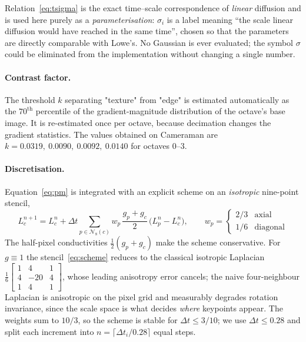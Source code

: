\documentclass[11pt,a4paper]{article}
\newcommand{\Kvals}{0.0319,\ 0.0090,\ 0.0092,\ 0.0140}  %
\begin{document}
Relation~\eqref{eq:tsigma} is the exact time--scale correspondence of
\emph{linear} diffusion and is used here purely as a \emph{parameterisation}:
$\sigma_i$ is a label meaning ``the scale linear diffusion would have reached in
the same time'', chosen so that the parameters are directly comparable with
Lowe's. No Gaussian is ever evaluated; the symbol $\sigma$ could be eliminated
from the implementation without changing a single number.

\paragraph{Contrast factor.} The threshold $k$ separating "texture" from
"edge" is estimated automatically as the $70^{\text{th}}$ percentile of the
gradient-magnitude distribution of the octave's base image. It is re-estimated
once per octave, because decimation changes the gradient statistics. The values
obtained on Cameraman are $k=\Kvals$ for octaves $0$--$3$.

\paragraph{Discretisation.} Equation~\eqref{eq:pm} is integrated with an
explicit scheme on an \emph{isotropic} nine-point stencil,
\begin{equation}
L^{n+1}_{c}=L^{n}_{c}
+\Delta t\sum_{p\in\mathcal{N}_8(c)} w_p\,
\frac{g_p+g_c}{2}\,\bigl(L^{n}_{p}-L^{n}_{c}\bigr),
\qquad
w_p=\begin{cases}2/3 & \text{axial}\\[2pt] 1/6 & \text{diagonal}\end{cases}
\label{eq:scheme}
\end{equation}
The half-pixel conductivities $\tfrac12(g_p+g_c)$ make the scheme
conservative. For $g\equiv1$ the stencil~\eqref{eq:scheme} reduces to the
classical isotropic Laplacian $\frac16\left[\begin{smallmatrix}1&4&1\\
4&-20&4\\ 1&4&1\end{smallmatrix}\right]$, whose leading anisotropy error
cancels; the naive four-neighbour Laplacian is anisotropic on the pixel grid
and measurably degrades rotation invariance, since the scale space is what
decides \emph{where} keypoints appear. The weights sum to $10/3$, so the
scheme is stable for $\Delta t\le 3/10$; we use $\Delta t\le0.28$ and split
each increment into $n=\lceil\Delta t_i/0.28\rceil$ equal steps.
\end{document}
